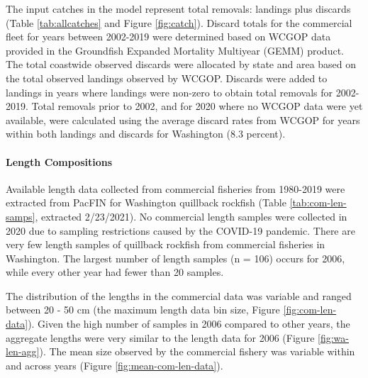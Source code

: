 \documentclass[11pt,
  english,
  a4paper,
]{article}
\begin{document}
\leavevmode\tagmcend\tagstructend\par


The input catches in the model represent total removals: landings plus discards (Table \ref{tab:allcatches} and Figure \ref{fig:catch}). Discard totals for the commercial fleet for years between 2002-2019 were determined based on WCGOP data provided in the Groundfish Expanded Mortality Multiyear (GEMM) product. The total coastwide observed discards were allocated by state and area based on the total observed landings observed by WCGOP. Discards were added to landings in years where landings were non-zero to obtain total removals for 2002-2019. Total removals prior to 2002, and for 2020 where no WCGOP data were yet available, were calculated using the average discard rates from WCGOP for years within both landings and discards for Washington (8.3 percent).

\leavevmode\tagmcend\tagstructend\par


\hypertarget{length-compositions}{%
\paragraph{Length Compositions}\label{length-compositions}}

\leavevmode\tagmcend\tagstructend


Available length data collected from commercial fisheries from 1980-2019 were extracted from PacFIN for Washington quillback rockfish (Table \ref{tab:com-len-samps}, extracted 2/23/2021). No commercial length samples were collected in 2020 due to sampling restrictions caused by the COVID-19 pandemic. There are very few length samples of quillback rockfish from commercial fisheries in Washington. The largest number of length samples (n = 106) occurs for 2006, while every other year had fewer than 20 samples.

\leavevmode\tagmcend\tagstructend\par


The distribution of the lengths in the commercial data was variable and ranged between 20 - 50 cm (the maximum length data bin size, Figure \ref{fig:com-len-data}). Given the high number of samples in 2006 compared to other years, the aggregate lengths were very similar to the length data for 2006 (Figure \ref{fig:wa-len-agg}). The mean size observed by the commercial fishery was variable within and across years (Figure \ref{fig:mean-com-len-data}).
\end{document}
